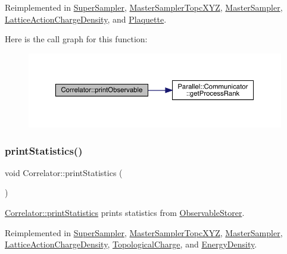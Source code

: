 Reimplemented in \mbox{\hyperlink{class_super_sampler_adf92b9281ee9a782e6c00424dd23451d}{Super\+Sampler}}, \mbox{\hyperlink{class_master_sampler_topc_x_y_z_ab2312c9e9dc1e9deeb5bce36784372ac}{Master\+Sampler\+Topc\+X\+YZ}}, \mbox{\hyperlink{class_master_sampler_a41853c3e4ab52fca7d93cf80e8702b7a}{Master\+Sampler}}, \mbox{\hyperlink{class_lattice_action_charge_density_abb7db718d4069faab0ed19f31aa85ad4}{Lattice\+Action\+Charge\+Density}}, and \mbox{\hyperlink{class_plaquette_aa15bf42749c9fd995d4d572ca3ed4f22}{Plaquette}}.

Here is the call graph for this function\+:\nopagebreak
\begin{figure}[H]
\begin{center}
\leavevmode
\includegraphics[width=350pt]{class_correlator_a15744ddb9f2b71fff34ac762d101df38_cgraph}
\end{center}
\end{figure}
\mbox{\label{class_correlator_a2168d677f547769784781d2e2aaa53cf}} 
\subsubsection{\texorpdfstring{printStatistics()}{printStatistics()}}
{\footnotesize\ttfamily void Correlator\+::print\+Statistics (\begin{DoxyParamCaption}{ }\end{DoxyParamCaption})\hspace{0.3cm}{\ttfamily [virtual]}}



\mbox{\hyperlink{class_correlator_a2168d677f547769784781d2e2aaa53cf}{Correlator\+::print\+Statistics}} prints statistics from \mbox{\hyperlink{class_observable_storer}{Observable\+Storer}}. 



Reimplemented in \mbox{\hyperlink{class_super_sampler_a04b230314ae446c77172c97ff52cf4f3}{Super\+Sampler}}, \mbox{\hyperlink{class_master_sampler_topc_x_y_z_a5a34a7f90ce8eea6c0efa06cfdfeb5f1}{Master\+Sampler\+Topc\+X\+YZ}}, \mbox{\hyperlink{class_master_sampler_a9accfc83c05d3013396355e40257a562}{Master\+Sampler}}, \mbox{\hyperlink{class_lattice_action_charge_density_abdaa497dd70dee58b810de7315241a56}{Lattice\+Action\+Charge\+Density}}, \mbox{\hyperlink{class_topological_charge_ad56263921d283d315b04ab40c9594a2c}{Topological\+Charge}}, and \mbox{\hyperlink{class_energy_density_ad108e32bc670f17f15b4ed433d8bbec7}{Energy\+Density}}.

